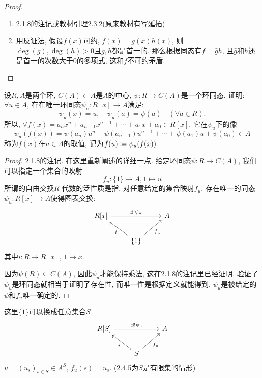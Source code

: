 \documentclass{../solutions-cn}
\begin{document}
\begin{proof}
    \begin{enumerate}[(1)]
        \item 2.1.8的注记或教材引理2.3.2(原来教材有写延拓)
        \item 用反证法, 假设$f(x)$可约, $f(x) = g(x)h(x)$, 则$\deg(g), \deg(h) > 0$且$g, h$都是首一的. 那么根据同态有$\bar{f} = \bar{g}\bar{h}$, 且$\bar{g}$和$\bar{h}$还是首一的次数大于$0$的多项式, 这和$\bar{f}$不可约矛盾.
    \end{enumerate}
\end{proof}

\begin{exercise}[习题2.3.7]
    设$R, A$是两个环, $C(A) \subset A$是$A$的中心, $\psi:R \to C(A)$是一个环同态. 证明: $\forall u \in A$, 存在唯一环同态$\psi_u:R[x] \to A$满足: 
    \[
        \psi_u(x) = u,\quad \psi_u(a) = \psi(a) \quad (\forall a \in R).
    \]
    所以, $\forall f(x) = a_nx^n + a_{n - 1}x^{n - 1} + \cdots + a_1x + a_0 \in R[x]$, 它在$\psi_u$下的像
    \[
        \psi_u(f(x)) = \psi(a_n)u^n + \psi(a_{n - 1})u^{n - 1} + \cdots + \psi(a_1)u + \psi(a_0) \in A
    \]
    称为$f(x)$在$u \in A$的取值, 记为$f(u) \mathrel{\coloneqq} \psi_u(f(x))$.
\end{exercise}

\begin{proof}
    2.1.8的注记. 在这里重新阐述的详细一点. 给定环同态$\psi:R \to C(A)$, 我们可以指定一个集合的映射
    \[
        f_u:\{1\} \to A, 1 \mapsto u
    \]
    所谓的自由交换$R$-代数的泛性质是指, 对任意给定的集合映射$f_u$, 存在唯一的同态$\psi_u:R[x] \to A$使得图表交换:
    \[
        \begin{tikzcd}
            {R[x]} \arrow[rr, "\exists!\psi_u"] &                                          & A \\
                                                & \{1\} \arrow[lu, "i"] \arrow[ru, "f_u"'] &  
        \end{tikzcd}
    \]
    其中$i:R \to R[x],\, 1 \mapsto x$.

    因为$\psi(R) \subseteq C(A)$, 因此$\psi_u$才能保持乘法, 这在2.1.8的注记里已经证明. 验证了$\psi_u$是环同态就相当于证明了存在性, 而唯一性是根据定义就能得到, $\psi_u$是被给定的$\psi$和$f_u$唯一确定的.
\end{proof}

\begin{remark}
    这里$\{1\}$可以换成任意集合$S$
    \[
        \begin{tikzcd}
        {R[S]} \arrow[rr, "\exists!\psi_u"] &                                      & A \\
                                            & S \arrow[lu, "i"] \arrow[ru, "f_u"'] &  
        \end{tikzcd}
    \]
    $u = (u_s)_{s \in S} \in A^S,\, f_u(s) = u_s$. (2.4.5为$S$是有限集的情形)
\end{remark}
\end{document}
